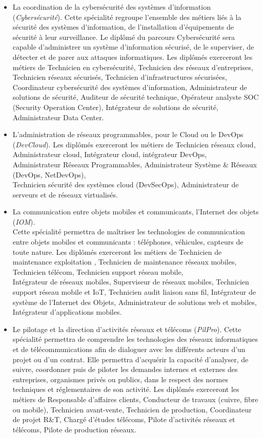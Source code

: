 \medskip
\begin{itemize}[leftmargin=5ex]
	\item La coordination de la cybersécurité des systèmes d'information ({\em Cybersécurité}). Cette spécialité regroupe l'ensemble des métiers liés à la sécurité des systèmes d'information, de l'installation d'équipements de sécurité à leur surveillance. Le diplômé du parcours Cybersécurité sera capable d'administrer un système d'information sécurisé, de le superviser, de détecter et de parer aux attaques informatiques. Les diplômés exerceront les métiers de Technicien en cybersécurité, Technicien des réseaux d'entreprises, Technicien réseaux sécurisés, Technicien d'infrastructures sécurisées, Coordinateur cybersécurité des systèmes d'information, Administrateur de solutions de sécurité, Auditeur de sécurité technique, Opérateur analyste SOC (Security Operation Center), Intégrateur de solutions de sécurité, Administrateur Data Center.
	
	\item L'administration de réseaux programmables, pour le Cloud ou le DevOps ({\em DevCloud}). Les diplômés exerceront les métiers de Technicien réseaux cloud, Administrateur cloud, Intégrateur cloud, intégrateur DevOps,\\
	Administrateur Réseaux Programmables, Administrateur Système \& Réseaux (DevOps, NetDevOps),\\
	Technicien sécurité des systèmes cloud (DevSecOps), Administrateur de serveurs et de réseaux virtualisés.
	
	\item La communication entre objets mobiles et communicants, l'Internet des objets ({\em IOM}).\\
	Cette spécialité permettra de maîtriser les technologies de communication entre objets mobiles et communi\-cants : téléphones, véhicules, capteurs de toute nature. Les diplômés exerceront les métiers de Technicien de maintenance exploitation , Technicien de maintenance réseaux mobiles, Technicien télécom, Technicien support réseau mobile, \\
	Intégrateur de réseaux mobiles, Superviseur de réseaux mobiles, Technicien support réseau mobile et IoT, Technicien audit liaison sans fil, Intégrateur de système de l’Internet des Objets, Administrateur de solutions web et mobiles, Intégrateur d’applications mobiles.
	
	\item Le pilotage et la direction d'activités réseaux et télécoms ({\em PilPro}). Cette spécialité permettra de comprendre les technologies des réseaux informatiques et de télécommunications afin de dialoguer avec les différents acteurs d’un projet ou d’un contrat. Elle permettra d’acquérir la capacité d’analyser, de suivre, coordonner puis de piloter les demandes internes et externes des entreprises, organismes privés ou publics, dans le respect des normes techniques et réglementaires de son activité. Les diplômés exerceront les métiers de Responsable d'affaires clients, Conducteur de travaux (cuivre, fibre ou mobile), Technicien avant-vente, Technicien de production, Coordinateur de projet R\&T, Chargé d’études télécoms, Pilote d’activités réseaux et télécoms, Pilote de production réseaux.
	

\end{itemize}
